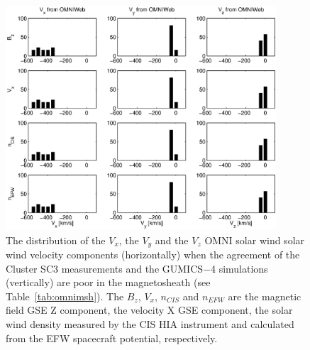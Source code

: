 \documentclass[linenumbers,draft]{agujournal}
\begin{document}
\begin{figure}[h]
\centering
\includegraphics[width=0.9\textwidth,angle=0]{swe-2020-corr-f17.eps}  
\caption{The distribution of the $V_{x}$, the $V_{y}$ and the $V_{z}$ OMNI solar wind solar wind velocity components (horizontally) when the agreement of the Cluster SC3 measurements and the GUMICS$-$4 simulations (vertically) are poor in the magnetosheath (see Table~\ref{tab:omnimsh}). The $B_{z}$, $V_{x}$, $n_{CIS}$ and $n_{EFW}$ are the magnetic field GSE Z component, the velocity X GSE component, the solar wind density measured by the CIS HIA instrument and calculated from the EFW spacecraft potential, respectively.}
\label{fig:mshomnivxyz}
\end{figure}

\pagebreak
\end{document}

